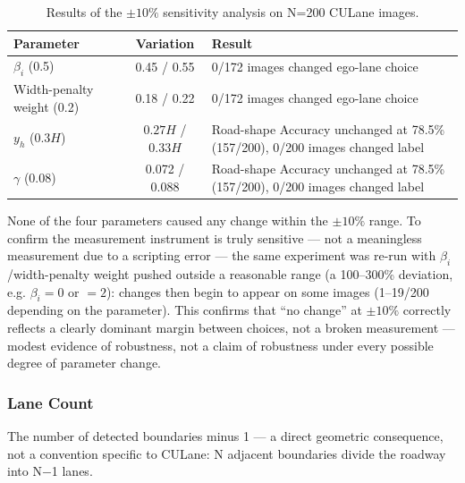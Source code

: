 \documentclass[12pt,a4paper]{report}
\begin{document}
\begin{table}[htbp]
    \centering
    \small
    \caption{Results of the $\pm10\%$ sensitivity analysis on N=200 CULane images.}
    \label{tab:3.3b}
    \begin{tabularx}{\linewidth}{@{}lcX@{}}
        \toprule
        \textbf{Parameter} & \textbf{Variation} & \textbf{Result} \\
        \midrule
        $\beta_i$ (0.5) & 0.45 / 0.55 & 0/172 images changed ego-lane choice \\
        Width-penalty weight (0.2) & 0.18 / 0.22 & 0/172 images changed ego-lane choice \\
        $y_h$ ($0.3H$) & $0.27H$ / $0.33H$ & Road-shape Accuracy unchanged at 78.5\% (157/200), 0/200 images changed label \\
        $\gamma$ (0.08) & 0.072 / 0.088 & Road-shape Accuracy unchanged at 78.5\% (157/200), 0/200 images changed label \\
        \bottomrule
    \end{tabularx}
\end{table}

None of the four parameters caused any change within the $\pm10\%$ range. To confirm the measurement instrument is truly sensitive --- not a meaningless measurement due to a scripting error --- the same experiment was re-run with $\beta_i$/width-penalty weight pushed outside a reasonable range (a 100--300\% deviation, e.g. $\beta_i=0$ or $=2$): changes then begin to appear on some images (1--19/200 depending on the parameter). This confirms that ``no change'' at $\pm10\%$ correctly reflects a clearly dominant margin between choices, not a broken measurement --- modest evidence of robustness, not a claim of robustness under every possible degree of parameter change.

\subsubsection*{Lane Count}

The number of detected boundaries minus 1 --- a direct geometric consequence, not a convention specific to CULane: N adjacent boundaries divide the roadway into N$-$1 lanes.
\end{document}
